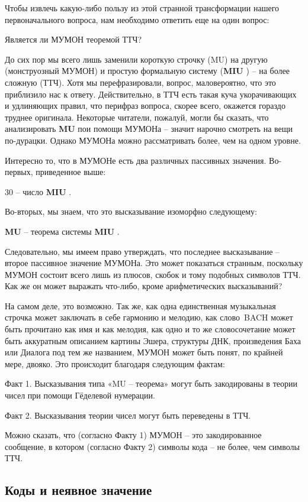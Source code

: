 \documentclass[../main.tex]{subfiles}
\begin{document}
Чтобы извлечь какую-либо пользу из этой странной трансформации нашего первоначального вопроса, нам необходимо ответить еще на один вопрос:

Является ли МУМОН теоремой ТТЧ?

До сих пор мы всего лишь заменили короткую строчку (MU) на другую (монструозный МУМОН) и простую формальную систему (\textbf{MIU} ) \--- на более сложную (ТТЧ). Хотя мы перефразировали, вопрос, маловероятно, что это приблизило нас к ответу. Действительно, в ТТЧ есть такая куча укорачивающих и удлиняющих правил, что перифраз вопроса, скорее всего, окажется гораздо труднее оригинала. Некоторые читатели, пожалуй, могли бы сказать, что анализировать \textbf{MU} пои помощи МУМОНа \--- значит нарочно смотреть на вещи по-дурацки. Однако МУМОНа можно рассматривать более, чем на одном уровне.

Интересно то, что в МУМОНе есть два различных пассивных значения. Во-первых, приведенное выше:

30 \--- число \textbf{MIU} .

Во-вторых, мы знаем, что это высказывание изоморфно следующему:

\textbf{MU} \--- теорема системы \textbf{MIU} .

Следовательно, мы имеем право утверждать, что последнее высказывание \--- второе пассивное значение МУМОНа. Это может показаться странным, поскольку МУМОН состоит всего лишь из плюсов, скобок и тому подобных символов ТТЧ. Как же он может выражать что-либо, кроме арифметических высказываний?

На самом деле, это возможно. Так же, как одна единственная музыкальная строчка может заключать в себе гармонию и мелодию, как слово~BACH может быть прочитано как имя и как мелодия, как одно и то же словосочетание может быть аккуратным описанием картины Эшера, структуры ДНК, произведения Баха или Диалога под тем же названием, МУМОН может быть понят, по крайней мере, двояко. Это происходит благодаря следующим фактам:

Факт 1. Высказывания типа «MU \--- теорема» могут быть закодированы в теории чисел при помощи Гёделевой нумерации.

Факт 2. Высказывания теории чисел могут быть переведены в ТТЧ.

Можно сказать, что (согласно Факту 1) МУМОН \--- это закодированное сообщение, в котором (согласно Факту 2) символы кода \--- не более, чем символы ТТЧ.


\subsection{Коды и неявное значение}
\end{document}
